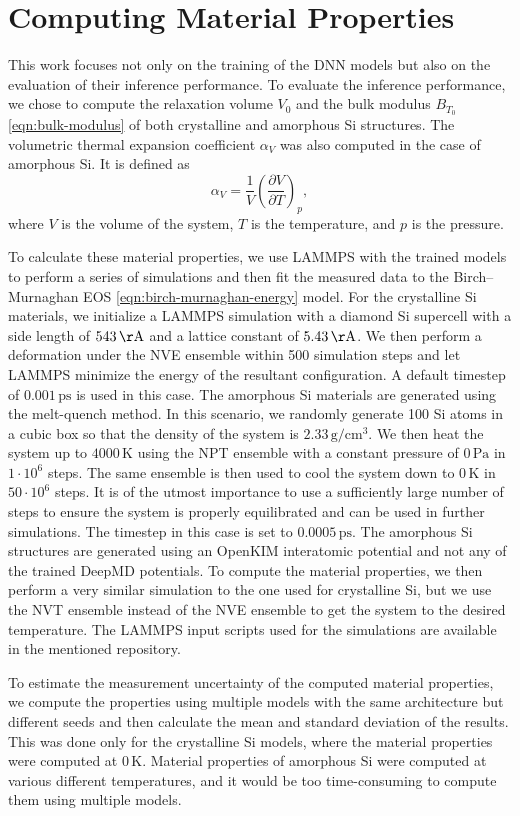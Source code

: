 \section{Computing Material Properties}

This work focuses not only on the training of the DNN models but also on
the evaluation of their inference performance. To evaluate the inference
performance, we chose to compute the relaxation volume $V_0$ and the bulk
modulus $B_{T_0}$ \eqref{eqn:bulk-modulus} of both crystalline and amorphous
Si structures. The volumetric thermal expansion coefficient $\alpha_V$ was
also computed in the case of amorphous Si. It is defined as
\begin{equation}
  \alpha_V = \frac{1}{V} \left( \frac{\partial V}{\partial T} \right)_p,
\end{equation}
where $V$ is the volume of the system, $T$ is the temperature, and $p$ is the
pressure.

To calculate these material properties, we use LAMMPS with the trained models
to perform a series of simulations and then fit the measured data to the
Birch--Murnaghan EOS \eqref{eqn:birch-murnaghan-energy} model. For the
crystalline Si materials, we initialize a LAMMPS simulation with a diamond Si
supercell with a side length of $543 \, \mathrm{\AA}$ and a lattice constant
of $5.43 \, \mathrm{\AA}$. We then perform a deformation under the NVE
ensemble within 500 simulation steps and let LAMMPS minimize the energy of the
resultant configuration. A default timestep of $0.001 \, \mathrm{ps}$ is used
in this case. The amorphous Si materials are generated using the melt-quench
method. In this scenario, we randomly generate 100 Si atoms in a cubic box so
that the density of the system is $2.33 \, \mathrm{g/cm^3}$. We then heat the
system up to $4000 \, \mathrm{K}$ using the NPT ensemble with a constant
pressure of $0 \, \mathrm{Pa}$ in $1 \cdot 10^{6}$ steps. The same ensemble is
then used to cool the system down to $0 \, \mathrm{K}$ in $50 \cdot 10^{6}$
steps. It is of the utmost importance to use a sufficiently large number of
steps to ensure the system is properly equilibrated and can be used in further
simulations. The timestep in this case is set to $0.0005 \, \mathrm{ps}$. The
amorphous Si structures are generated using an OpenKIM interatomic potential
and not any of the trained DeepMD potentials. To compute the material
properties, we then perform a very similar simulation to the one used for
crystalline Si, but we use the NVT ensemble instead of the NVE ensemble to get
the system to the desired temperature. The LAMMPS input scripts used for the
simulations are available in the mentioned repository.

To estimate the measurement uncertainty of the computed material properties,
we compute the properties using multiple models with the same architecture
but different seeds and then calculate the mean and standard deviation of the
results. This was done only for the crystalline Si models, where the material
properties were computed at $0 \, \mathrm{K}$. Material properties of
amorphous Si were computed at various different temperatures, and it would be
too time-consuming to compute them using multiple models.
